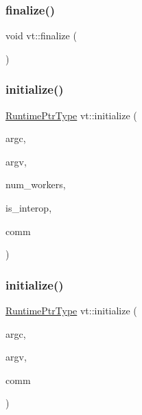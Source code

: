 \mbox{\label{namespacevt_ae8e663109f635cbeca94c39b89b4683c}} 
\subsubsection{\texorpdfstring{finalize()}{finalize()}\hspace{0.1cm}{\footnotesize\ttfamily [2/2]}}
{\footnotesize\ttfamily void vt\+::finalize (\begin{DoxyParamCaption}{ }\end{DoxyParamCaption})}

\mbox{\label{namespacevt_aaa266774ea8339c58be0202b00fafa62}} 
\subsubsection{\texorpdfstring{initialize()}{initialize()}\hspace{0.1cm}{\footnotesize\ttfamily [1/3]}}
{\footnotesize\ttfamily \hyperlink{namespacevt_a0ce60e0299d8fa32223b3b9ffa0af466}{Runtime\+Ptr\+Type} vt\+::initialize (\begin{DoxyParamCaption}\item[{int \&}]{argc,  }\item[{char $\ast$$\ast$\&}]{argv,  }\item[{\hyperlink{namespacevt_aa93398ea48f2cb6c188512250f7cc248}{Worker\+Count\+Type} const}]{num\+\_\+workers,  }\item[{bool}]{is\+\_\+interop,  }\item[{M\+P\+I\+\_\+\+Comm $\ast$}]{comm }\end{DoxyParamCaption})}

\mbox{\label{namespacevt_adb614f53d39c8e84417ad7aac3265645}} 
\subsubsection{\texorpdfstring{initialize()}{initialize()}\hspace{0.1cm}{\footnotesize\ttfamily [2/3]}}
{\footnotesize\ttfamily \hyperlink{namespacevt_a0ce60e0299d8fa32223b3b9ffa0af466}{Runtime\+Ptr\+Type} vt\+::initialize (\begin{DoxyParamCaption}\item[{int \&}]{argc,  }\item[{char $\ast$$\ast$\&}]{argv,  }\item[{M\+P\+I\+\_\+\+Comm $\ast$}]{comm }\end{DoxyParamCaption})}

